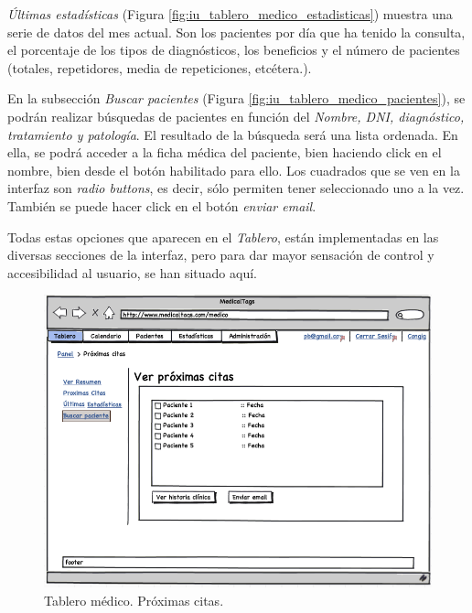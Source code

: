 			\textit{Últimas estadísticas} (Figura \ref{fig:iu_tablero_medico_estadisticas}) muestra una serie de datos del mes actual. Son los pacientes por día que ha tenido la consulta, el porcentaje de los tipos de diagnósticos, los beneficios y el número de pacientes (totales, repetidores, media de repeticiones, etcétera.).
		
			En la subsección \textit{Buscar pacientes} (Figura \ref{fig:iu_tablero_medico_pacientes}), se podrán realizar búsquedas de pacientes en función del \textit{Nombre, DNI, diagnóstico, tratamiento y patología}. El resultado de la búsqueda será una lista ordenada. En ella, se podrá acceder a la ficha médica del paciente, bien haciendo click en el nombre, bien desde el botón habilitado para ello. Los cuadrados que se ven en la interfaz son \textit{radio buttons}, es decir, sólo permiten tener seleccionado uno a la vez. También se puede hacer click en el botón \textit{enviar email}.
			
			Todas estas opciones que aparecen en el \textit{Tablero}, están implementadas en las diversas secciones de la interfaz, pero para dar mayor sensación de control y accesibilidad al usuario, se han situado aquí.
			
			
			\begin{figure}[H]
			  \centering
			    \includegraphics[width=12cm]{img/png/interfaz/9_Dashboard_Medico_Tablero_Citas.png}
			  \caption{Tablero médico. Próximas citas.}
			  \label{fig:iu_tablero_medico_citas}
			\end{figure}
			
